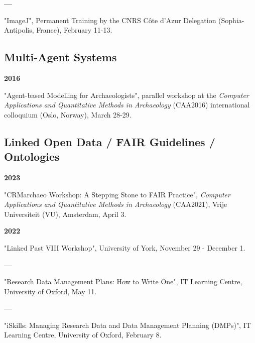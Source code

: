 \documentclass{article}
\newcommand{\fr}[1]{}       %
\newcommand{\en}[1]{#1}     %
\begin{document}
\smallbreak
\textbf{--- }
\fr{"ImageJ", Formation permanente de la Délégation CNRS Côte d'Azur (Sophia-Antipolis, France), 11-13 Février.}
\en{"ImageJ", Permanent Training by the CNRS Côte d'Azur Delegation (Sophia-Antipolis, France), February 11-13.}

\smallbreak

\subsection*{\fr{Systèmes Multi-Agents}\en{Multi-Agent Systems}}

\textbf{2016 }
\fr{"Agent-based modelling for archaeologists", atelier en parallèle du \textit{Computer Applications and Quantitative Methods in Archaeology} (CAA2016) international colloquium (Oslo, Norway), 28-29 Mars.}
\en{"Agent-based Modelling for Archaeologists", parallel workshop at the \textit{Computer Applications and Quantitative Methods in Archaeology} (CAA2016) international colloquium (Oslo, Norway), March 28-29.}

\smallbreak

\subsection*{\fr{Linked Open Data / directives FAIR / Ontologies}\en{Linked Open Data / FAIR Guidelines / Ontologies}}

\textbf{2023 }
\fr{"CRMarchaeo Workshop: a stepping stone to FAIR practice", \textit{Computer Applications and Quantitative Methods in Archaeology} (CAA2021), Vrije Universiteit (VU), Amsterdam, 3 Avril.}
\en{"CRMarchaeo Workshop: A Stepping Stone to FAIR Practice", \textit{Computer Applications and Quantitative Methods in Archaeology} (CAA2021), Vrije Universiteit (VU), Amsterdam, April 3.}

\smallbreak
\textbf{2022 }
\fr{"Linked Past VIII workshop", University of York, 29 Novembre - 1 Décembre.}
\en{"Linked Past VIII Workshop", University of York, November 29 - December 1.}

\smallbreak
\textbf{--- }
\fr{"Research data management plans: How to write one", IT Learning Centre, University of Oxford, 11 Mai.}
\en{"Research Data Management Plans: How to Write One", IT Learning Centre, University of Oxford, May 11.}

\smallbreak
\textbf{--- }
\fr{"iSkills: Managing research data and Data Management Planning (DMPs)", IT Learning Centre, University of Oxford, 8 Février.}
\en{"iSkills: Managing Research Data and Data Management Planning (DMPs)", IT Learning Centre, University of Oxford, February 8.}
\end{document}
